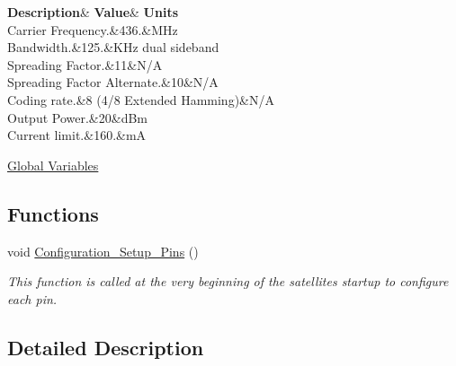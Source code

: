 \begin{DoxyCompactItemize}
\begin{DoxyCompactList}
\begin{longtabu}
\endfirsthead
\hline
\endfoot
\hline
\rowcolor{\tableheadbgcolor}\textbf{ Description}&\textbf{ Value}&\textbf{ Units  }\\
\endhead
Carrier Frequency.&436.&M\+Hz \\
Bandwidth.&125.&K\+Hz dual sideband \\
Spreading Factor.&11&N/A \\
Spreading Factor Alternate.&10&N/A \\
Coding rate.&8 (4/8 Extended Hamming)&N/A \\
Output Power.&20&d\+Bm \\
Current limit.&160.&mA \\
\end{longtabu}
\end{DoxyCompactList}\item 
\hyperlink{group__defines__global__variables}{Global Variables}
\end{DoxyCompactItemize}
\subsection*{Functions}
\begin{DoxyCompactItemize}
\item 
\mbox{\label{group__configuration__page_ga7ec89402e9818cff2cb6543057cfa82c}} 
void \hyperlink{group__configuration__page_ga7ec89402e9818cff2cb6543057cfa82c}{Configuration\+\_\+\+Setup\+\_\+\+Pins} ()
\begin{DoxyCompactList}\small\item\em This function is called at the very beginning of the satellite\textquotesingle{}s startup to configure each pin. \end{DoxyCompactList}\end{DoxyCompactItemize}


\subsection{Detailed Description}
